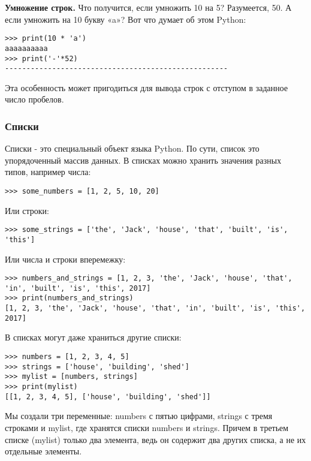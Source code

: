 \documentclass[11pt]{article}
\begin{document}
\textbf{Умножение строк.} Что получится, если умножить 10 на 5?
Разумеется, 50. А если умножить на 10 букву «a»? Вот что думает об этом
Python:

\begin{verbatim}
>>> print(10 * 'a')
aaaaaaaaaa
>>> print('-'*52)
----------------------------------------------------
\end{verbatim}

Эта особенность может пригодиться для вывода строк с отступом в заданное
число пробелов.

\subsubsection{Списки}\label{ux441ux43fux438ux441ux43aux438}

Списки - это специальный объект языка Python. По сути, список это
упорядоченный массив данных. В списках можно хранить значения разных
типов, например числа:

\begin{verbatim}
>>> some_numbers = [1, 2, 5, 10, 20]
\end{verbatim}

Или строки:

\begin{verbatim}
>>> some_strings = ['the', 'Jack', 'house', 'that', 'built', 'is', 'this']
\end{verbatim}

Или числа и строки вперемежку:

\begin{verbatim}
>>> numbers_and_strings = [1, 2, 3, 'the', 'Jack', 'house', 'that', 'in', 'built', 'is', 'this', 2017]
>>> print(numbers_and_strings)
[1, 2, 3, 'the', 'Jack', 'house', 'that', 'in', 'built', 'is', 'this', 2017]
\end{verbatim}

В списках могут даже храниться другие списки:

\begin{verbatim}
>>> numbers = [1, 2, 3, 4, 5]
>>> strings = ['house', 'building', 'shed']
>>> mylist = [numbers, strings]
>>> print(mylist)
[[1, 2, 3, 4, 5], ['house', 'building', 'shed']]
\end{verbatim}

Мы создали три переменные: numbers с пятью цифрами, strings с тремя
строками и mylist, где хранятся списки numbers и strings. Причем в
третьем списке (mylist) только два элемента, ведь он содержит два других
списка, а не их отдельные элементы.
\end{document}
